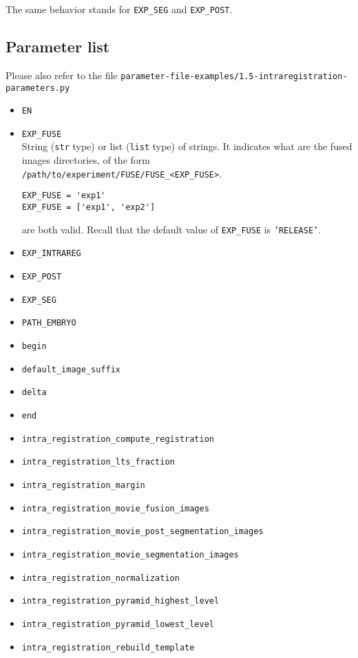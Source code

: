 The same behavior stands for \texttt{EXP\_SEG} and  \texttt{EXP\_POST}.

\subsection{Parameter list}

Please also refer to the file
\texttt{parameter-file-examples/1.5-intraregistration-parameters.py}

\begin{itemize}
\itemsep -1ex
\item \texttt{EN}
\item \texttt{EXP\_FUSE} \\
  String (\texttt{str} type) or list (\texttt{list} type) of
  strings. It indicates what are the fused images directories, of the form
  \texttt{/path/to/experiment/FUSE/FUSE\_<EXP\_FUSE>}.
\begin{verbatim}
EXP_FUSE = 'exp1'
EXP_FUSE = ['exp1', 'exp2']
\end{verbatim}
  are both valid. Recall that the default value of \texttt{EXP\_FUSE}
  is \texttt{'RELEASE'}.
\item \texttt{EXP\_INTRAREG}
\item \texttt{EXP\_POST}
\item \texttt{EXP\_SEG}
\item \texttt{PATH\_EMBRYO}
\item \texttt{begin}
\item \texttt{default\_image\_suffix}
\item \texttt{delta}
\item \texttt{end}
\item \texttt{intra\_registration\_compute\_registration}
\item \texttt{intra\_registration\_lts\_fraction}
\item \texttt{intra\_registration\_margin}
\item \texttt{intra\_registration\_movie\_fusion\_images}
\item \texttt{intra\_registration\_movie\_post\_segmentation\_images}
\item \texttt{intra\_registration\_movie\_segmentation\_images}
\item \texttt{intra\_registration\_normalization}
\item \texttt{intra\_registration\_pyramid\_highest\_level}
\item \texttt{intra\_registration\_pyramid\_lowest\_level}
\item \texttt{intra\_registration\_rebuild\_template}\\

\end{itemize}
